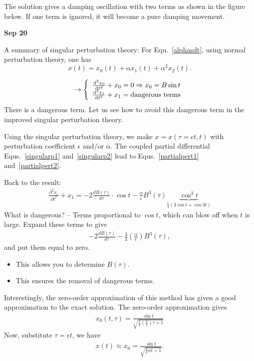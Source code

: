 The solution gives a damping oscillation with two terms as shown in the figure below.
If one term is ignored, it will become a pure damping movement. 

   
\textbf{Sep 20}

A summary of singular perturbation theory: For Equ.~\eqref{alphasdt}, using normal perturbation theory, one has
\begin{equation}
x(t)= x_0(t)+ \alpha x_1(t) +\alpha^2 x_2(t).
\end{equation}

\begin{equation}
\rightarrow \left\{ \begin{array}{c}
\frac{{\mathrm d}^2 {x_0}}{{\mathrm d}t^2} + x_0 =0\Rightarrow x_0=B\sin t\\
\frac{{\mathrm d}^2 {x_1}}{{\mathrm d}t^2}+ x_1 =\text{dangerous terms}
\end{array}\right.
\end{equation}
There is a dangerous term. Let us see how to avoid this dangerous term in the improved singular perturbation theory. 

Using the singular perturbation theory, we make $ x=x(\tau=\epsilon t,t) $ with perturbation coefficient $ \epsilon $ and/or $ \alpha $. 
The coupled partial differential Equs.~\eqref{singularp1} and~\eqref{singularp2} lead to 
Equs.~\eqref{partialpert1} and~\eqref{partialpert2}. 

Back to the result:
\begin{align}
\frac{\partial^2 x_1}{\partial t^2}+x_1 = -2 \frac{dB(\tau)}{d\tau}\cdot \cos t - \frac{\alpha}{\epsilon} B^3(\tau) \underbrace{\cos^3 t}_{\frac{1}{4}(3\cos t+ \cos 3t)}
\end{align}
What is dangerous? -- Terms proportional to $ \cos t $, which can blow off when $ t $ is large.  
Expand these terms to give 
\begin{align}
-2 \frac{d B(\tau)}{d\tau}- \frac{3}{4}\left(\frac{\alpha}{\epsilon} \right)B^3(\tau),
\end{align}
and put them equal to zero.
\begin{itemize}
\item This allows you to determine $ B(\tau) $. 
\item This ensures the removal of dangerous terms.
\end{itemize}

Interestingly, the zero-order approximation of this method has given a good approximation to the exact solution. The zero-order approximation gives
\begin{align}
x_0(t,\tau)=\frac{\sin t}{\sqrt{\frac{3}{4}\left(\frac{\alpha}{\epsilon} \right)\tau +1}}
\end{align}
Now, substitute $ \tau=\epsilon t $, we have
\begin{align}
x(t)\approx x_0 = \frac{\sin t}{\sqrt{\frac{3}{4}\alpha t +1}}.
\end{align}
